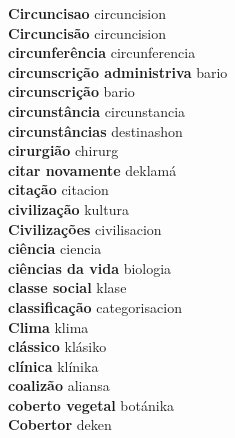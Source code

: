 \textbf{ Circuncisao  } circuncision \\
\textbf{ Circuncisão  } circuncision \\
\textbf{ circunferência  } circunferencia \\
\textbf{ circunscrição administriva  } bario \\
\textbf{ circunscrição  } bario \\
\textbf{ circunstância  } circunstancia \\
\textbf{ circunstâncias  } destinashon \\
\textbf{ cirurgião  } chirurg \\
\textbf{ citar novamente  } deklamá \\
\textbf{ citação  } citacion \\
\textbf{ civilização  } kultura \\
\textbf{ Civilizações  } civilisacion \\
\textbf{ ciência  } ciencia \\
\textbf{ ciências da vida  } biologia \\
\textbf{ classe social  } klase \\
\textbf{ classificação  } categorisacion \\
\textbf{ Clima  } klima \\
\textbf{ clássico  } klásiko \\
\textbf{ clínica  } klínika \\
\textbf{ coalizão  } aliansa \\
\textbf{ coberto vegetal  } botánika \\
\textbf{ Cobertor  } deken \\
